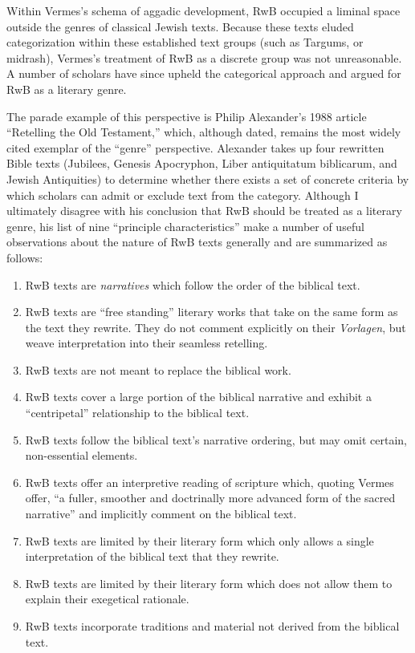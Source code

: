 Within Vermes's schema of aggadic development, RwB occupied a liminal
space outside the genres of classical Jewish texts. Because these texts
eluded categorization within these established text groups (such as
Targums, or midrash), Vermes's treatment of RwB as a discrete group was
not unreasonable. A number of scholars have since upheld the categorical
approach and argued for RwB as a literary genre.

The parade example of this perspective is Philip Alexander's 1988
article ``Retelling the Old Testament,'' which, although dated, remains
the most widely cited exemplar of the ``genre''
perspective.\autocites{alexander_carson-williamson1988}[Vermes himself
even put his stamp of approval on it, see][4]{vermes_zsengeller2014}
Alexander takes up four rewritten Bible texts (Jubilees,
Genesis Apocryphon, Liber antiquitatum biblicarum, and
Jewish Antiquities) to determine whether there exists a set of concrete
criteria by which scholars can admit or exclude text from the category.
Although I ultimately disagree with his conclusion that RwB should be
treated as a literary genre, his list of nine ``principle
characteristics'' make a number of useful observations about the nature
of RwB texts generally and are summarized as follows:

\begin{enumerate}
\def\labelenumi{\arabic{enumi}.}
\tightlist
\item
  RwB texts are \emph{narratives} which follow the order of the biblical
  text.
\item
  RwB texts are ``free standing'' literary works that take on the same
  form as the text they rewrite. They do not comment explicitly on their
  \emph{Vorlagen}, but weave interpretation into their seamless
  retelling.
\item
  RwB texts are not meant to replace the biblical work.
\item
  RwB texts cover a large portion of the biblical narrative and exhibit
  a ``centripetal'' relationship to the biblical text.
\item
  RwB texts follow the biblical text's narrative ordering, but may omit
  certain, non-essential elements.
\item
  RwB texts offer an interpretive reading of scripture which, quoting
  Vermes offer, ``a fuller, smoother and doctrinally more advanced form
  of the sacred narrative''\autocite[Citing Vermes in][305]{schurer1986}
  and implicitly comment on the biblical text.
\item
  RwB texts are limited by their literary form which only allows a
  single interpretation of the biblical text that they rewrite.
\item
  RwB texts are limited by their literary form which does not allow them
  to explain their exegetical rationale.
\item
  RwB texts incorporate traditions and material not derived from the
  biblical text.
\end{enumerate}

